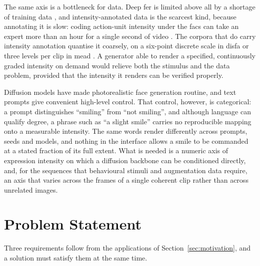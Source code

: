 The same axis is a bottleneck for data. Deep \gls{fer} is limited above all by a shortage of
training data \citep{li2022fersurvey}, and intensity-annotated data is the scarcest kind, because
annotating it is slow: coding action-unit intensity under the \gls{facs} \citep{ekman1978facs} can
take an expert more than an hour for a single second of video \citep{tran2017deepcoder}. The
corpora that do carry intensity annotation quantise it coarsely, on a six-point discrete scale in
\gls{disfa} \citep{mavadati2013disfa} or three levels per clip in \gls{mead}
\citep{wang2020mead}. A generator able to render a specified, continuously graded intensity on
demand would relieve both the stimulus and the data problem, provided that the intensity it
renders can be verified properly.

Diffusion models have made photorealistic face generation routine, and text prompts give
convenient high-level control. That control, however, is categorical: a prompt distinguishes
``smiling'' from ``not smiling'', and although language can qualify degree, a phrase such as
``a slight smile'' carries no reproducible mapping onto a measurable intensity. The same words
render differently across prompts, seeds and models, and nothing in the interface allows a smile
to be commanded at a stated fraction of its full extent. What is needed is a numeric axis of
expression intensity on which a diffusion backbone can be conditioned directly, and, for the
sequences that behavioural stimuli and augmentation data require, an axis that varies across the
frames of a single coherent clip rather than across unrelated images.

\section{Problem Statement}\label{sec:problem}


Three requirements follow from the
applications of Section~\ref{sec:motivation}, and a solution must satisfy them at the same time.

